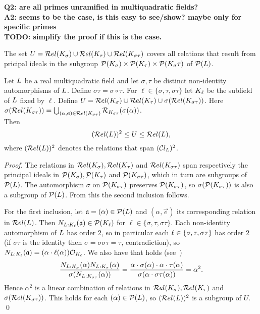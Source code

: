 \noindent
{\bf Q2: are all primes unramified in multiquadratic fields?\\
A2: seems to be the case, is this easy to see/show? maybe only for specific primes\\
TODO: simplify the proof if this is the case.}



\begin{mycor}
The set $U = \mathcal{R}el(K_{\sigma}) \cup \mathcal{R}el(K_{\tau}) \cup \mathcal{R}el(K_{\sigma\tau})$ 
covers all relations that result from pricipal ideals in the subgroup
$\mathcal{P}(K_{\sigma}) \times \mathcal{P}(K_{\tau}) \times \mathcal{P}(K_{\sigma}\tau)$ 
of $\mathcal{P}(L)$.
\end{mycor}

\begin{mylma}
\label{lemma:squares}
Let $L$ be a real multiquadratic field and let
$\sigma,\tau$ be distinct non-identity automorphisms of $L$.
Define $\sigma\tau = \sigma \circ \tau$.
For $\ell \in \{\sigma,\tau,\sigma\tau\}$
let $K_{\ell}$ be the subfield of $L$ fixed by $\ell$.
Define $U = \mathcal{R}el(K_{\sigma}) \cup \mathcal{R}el(K_{\tau}) \cup \sigma (\mathcal{R}el(K_{\sigma\tau}))$.
Here $\sigma (\rels {\K {\sigma\tau}}) = \bigcup_{(\alpha, \vec e) \in \rels {\K {\sigma\tau}}} \rel {\K {\sigma\tau}} {\sigma (\alpha)}$.\\
Then
\[(\mathcal{R}el(L))^2 \leq U \leq \mathcal{R}el(L),\]
where $(\mathcal{R}el(L))^2$ denotes the relations that span $(\mathcal{C}l_{L})^2$.
\end{mylma}
\begin{proof}
The relations in $\mathcal{R}el(K_{\sigma}),\mathcal{R}el(K_{\tau})$ and $\mathcal{R}el(K_{\sigma\tau})$
span respectively the principal ideals in $\mathcal{P}(K_{\sigma}),
\mathcal{P}(K_{\tau})$ and $\mathcal{P}(K_{\sigma\tau})$,
which in turn are subgroups of $\mathcal{P}(L)$.
The automorphism $\sigma$ on $\mathcal{P}(K_{\sigma\tau})$
preserves $\mathcal{P}(K_{\sigma\tau})$, so $\sigma (\mathcal{P}(K_{\sigma\tau}))$
is also a subgroup of $\mathcal{P}(L)$.
From this the second inclusion follows.

For the first inclusion, let $\mathfrak{a} = (\alpha) \in \mathcal{P}(L)$ and
$(\alpha, \vec e)$ its corresponding relation in $\mathcal{R}el(L)$.
Then $N_{L:K_{\ell}}(\mathfrak{a}) \in \mathcal{P}(K_{\ell})$ for $\ell \in \{\sigma,\tau,\sigma\tau\}$.
Each non-identity automorphism of $L$ has order $2$,
so in particular each $\ell\in\mathord{\left\lbrace{\sigma,\tau,\sigma\tau}\right\rbrace}$
has order $2$ (if $\sigma\tau$ is the identity
then $\sigma=\sigma\sigma\tau=\tau$, contradiction),
so $N_{L:K_{\ell}}(\mathfrak{a})=(\alpha\cdot \ell(\alpha))\mathcal{O}_{K_{\ell}}$.
We also have that holds (see~\cite{DBLP:conf/eurocrypt/BauchBVLV17})
$$
\frac{N_{L:K_{\sigma}}(\alpha)N_{L:K_{\tau}}(\alpha)}
{\sigma(N_{L:K_{\sigma\tau}}(\alpha))}
= \frac{\alpha\cdot\sigma(\alpha)\cdot \alpha\cdot\tau(\alpha)}{\sigma (\alpha\cdot\sigma\tau(\alpha))} = \alpha^2.
$$
Hence $\alpha^2$ is a linear combination of relations in
$\mathcal{R}el(K_{\sigma}), \mathcal{R}el(K_{\tau})$ and $\sigma (\mathcal{R}el(K_{\sigma\tau}))$.
This holds for each $(\alpha) \in \mathcal{P}(L)$,
so $(\mathcal{R}el(L))^2$ is a subgroup of $U$.
\qed
\end{proof}
